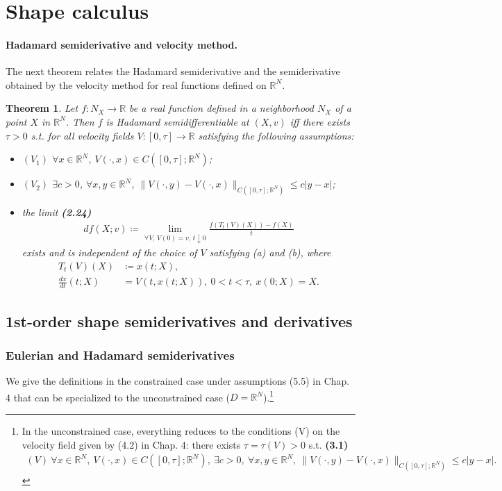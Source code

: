 \documentclass[oneside]{book}
\numberwithin{equation}{section}
\newtheorem{theorem}{Theorem}[section]
\begin{document}
\section{Shape calculus}
\paragraph*{Hadamard semiderivative and velocity method.} The next theorem relates the Hadamard semiderivative and the semiderivative obtained by the velocity method for real functions defined on $\mathbb{R}^N$.

\begin{theorem}
    Let $f:N_X\to\mathbb{R}$ be a real function defined in a neighborhood $N_X$ of a point $X$ in $\mathbb{R}^N$. Then $f$ is Hadamard semidifferentiable at $(X,v)$ iff there exists $\tau > 0$ s.t. for all velocity fields $V:[0,\tau]\to\mathbb{R}$ satisfying the following assumptions:
    \begin{itemize}
        \item[(a)] $(V_1)$ $\forall x\in\mathbb{R}^N$, $V(\cdot,x)\in C([0,\tau];\mathbb{R}^N)$;
        \item[(b)] $(V_2)$ $\exists c > 0$, $\forall x,y\in\mathbb{R}^N$, $\|V(\cdot,y) - V(\cdot,x)\|_{C([0,\tau];\mathbb{R}^N)}\le c|y - x|$;
        \item[(c)] the limit \textbf{(2.24)}
        \begin{align*}
            df(X;v)\coloneqq\lim_{\forall V,\,V(0) = v,\,t\downarrow 0} \frac{f\left(T_t(V)(X)\right) - f(X)}{t}
        \end{align*}
        exists and is independent of the choice of $V$ satisfying (a) and (b), where
        \begin{align*}
            T_t(V)(X) &\coloneqq x(t;X),\\
            \frac{dx}{dt}(t;X) &= V\left(t,x(t;X)\right),\ 0 < t < \tau,\ x(0;X) = X.
        \end{align*}
    \end{itemize}
\end{theorem}

\subsection{1st-order shape semiderivatives and derivatives}

\subsubsection{Eulerian and Hadamard semiderivatives}
We give the definitions in the constrained case under assumptions (5.5) in Chap. 4 that can be specialized to the unconstrained case ($D = \mathbb{R}^N$).\footnote{In the unconstrained case, everything reduces to the conditions (V) on the velocity field given by (4.2) in Chap. 4: there exists $\tau = \tau(V) > 0$ s.t. \textbf{(3.1)}
    \begin{align*}
        (V)\ \forall x\in\mathbb{R}^N,\ V(\cdot,x)\in C([0,\tau];\mathbb{R}^N),\ \exists c > 0,\ \forall x,y\in\mathbb{R}^N,\ \|V(\cdot,y) - V(\cdot,x)\|_{C\left([0,\tau];\mathbb{R}^N\right)}\le c|y - x|.
\end{align*}}
\end{document}
